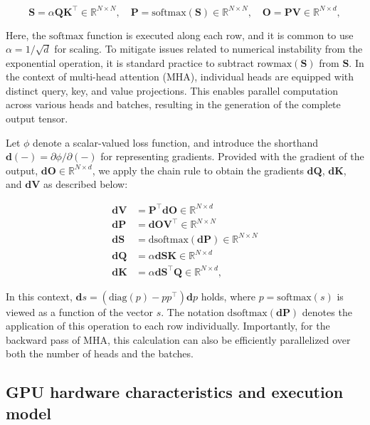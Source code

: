 \begin{equation*}
  \mathbf{S} = \alpha \mathbf{Q} \mathbf{K}^\top \in \mathbb{R}^{N \times N}, \quad \mathbf{P} = \mathrm{softmax}(\mathbf{S}) \in \mathbb{R}^{N \times N}, \quad \mathbf{O} = \mathbf{P}\mathbf{V} \in \mathbb{R}^{N \times d},
\end{equation*}

Here, the $\mathrm{softmax}$ function is executed along each row, and it is common to use $\alpha = 1/\sqrt{d}$ for scaling. To mitigate issues related to numerical instability from the exponential operation, it is standard practice to subtract $\mathrm{rowmax}(\mathbf{S})$ from $\mathbf{S}$. In the context of multi-head attention (MHA), individual heads are equipped with distinct query, key, and value projections. This enables parallel computation across various heads and batches, resulting in the generation of the complete output tensor.

Let $\phi$ denote a scalar-valued loss function, and introduce the shorthand $\mathbf{d}(-) = \partial \phi / \partial (-)$ for representing gradients. Provided with the gradient of the output, $\mathbf{dO} \in \mathbb{R}^{N \times d}$, we apply the chain rule to obtain the gradients $\mathbf{dQ}$, $\mathbf{dK}$, and $\mathbf{dV}$ as described below:

\begin{align*}
  \mathbf{dV} &= \mathbf{P}^\top \mathbf{dO} \in \mathbb{R}^{N \times d} \\
  \mathbf{dP} &= \mathbf{dO} \mathbf{V}^\top \in \mathbb{R}^{N \times N} \\
  \mathbf{dS} &= \mathrm{dsoftmax} (\mathbf{dP}) \in \mathbb{R}^{N \times N} \\
  \mathbf{dQ} &= \alpha \mathbf{dS} \mathbf{K} \in \mathbb{R}^{N \times d} \\
  \mathbf{dK} &= \alpha \mathbf{dS}^\top \mathbf{Q} \in \mathbb{R}^{N \times d},
\end{align*}

In this context, $\mathbf{d}s = (\mathrm{diag}(p) - p p^\top)\mathbf{d}p$ holds, where $p = \mathrm{softmax}(s)$ is viewed as a function of the vector $s$. The notation $\mathrm{dsoftmax}(\mathbf{dP})$ denotes the application of this operation to each row individually. Importantly, for the backward pass of MHA, this calculation can also be efficiently parallelized over both the number of heads and the batches.

\subsection{GPU hardware characteristics and execution model}
\label{subsec:hardware}

